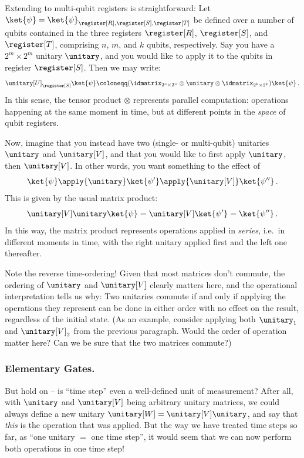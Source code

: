       Extending to multi-qubit registers is straightforward: 
        Let $\ket{\psi} = \ket{\psi}_{\register[R],\register[S],\register[T]}$ 
        be defined over a number of qubits contained in the three
        registers $\register[R]$, $\register[S]$, and
        $\register[T]$, comprising $n$, $m$, and $k$ qubits, respectively.
        Say you have a $2^m \times 2^m$ unitary $\unitary$, and you would like to apply
        it to the qubits in register $\register[S]$. Then we may write:
      \[
        \unitary[U]_{\register[S]} \ket{\psi}
        \coloneqq (\idmatrix_{2^n \times 2^n} \otimes \unitary \otimes 
        \idmatrix_{2^k \times 2^k}) \ket{\psi}\, .
      \]
      In this sense, the tensor product $\otimes$ represents parallel
        computation: operations
        happening at the same moment in time, but at different points in the
        \emph{space} of qubit registers.

      Now, imagine that you instead have two (single- or multi-qubit) unitaries
        $\unitary$ and $\unitary[V]$, and that you
        would like to first apply $\unitary$, then $\unitary[V]$. In other words, you want
        something to the effect of
      \[
        \ket{\psi} \apply{\unitary} \ket{\psi^\prime}
          \apply{\unitary[V]} \ket{\psi^{\prime\prime}}\, .
      \]
      This is given by the usual matrix product:
      \[
        \unitary[V] \unitary \ket{\psi}
        = \unitary[V] \ket{\psi^\prime}
        = \ket{\psi^{\prime\prime}}\, .
      \]
      In this way, the matrix product represents operations applied in
        \emph{series}, i.e.\ in different moments in time, 
        with the right unitary applied first and the left one thereafter. 

      Note the reverse time-ordering! Given that most matrices don't commute,
        the ordering of $\unitary$ and $\unitary[V]$ clearly matters here, 
        and the operational interpretation
        tells us why: Two unitaries commute if and only if
        applying the operations they represent can be done in either order with
        no effect on the result, regardless of the initial state. (As an
        example, consider applying both $\unitary_1$ and $\unitary[V]_2$ from the
        previous paragraph. Would the order of operation matter here? Can we be
        sure that the two matrices commute?)

    \subsubsection{Elementary Gates.}
      But hold on -- is ``time step'' even a well-defined unit of measurement? 
        After all, with $\unitary$ and $\unitary[V]$ being arbitrary unitary
        matrices, we could always define a new unitary $\unitary[W] = \unitary[V]
        \unitary$, and say that \emph{this} is the operation that was applied.
        But the way we have treated time steps so far, as ``one unitary $=$ one
        time step'', it would seem that we can now perform both operations in
        one time step!

